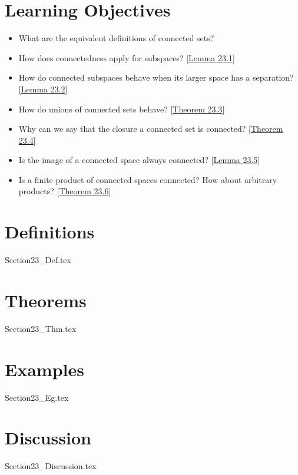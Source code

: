 \section{Learning Objectives}

\begin{itemize}
    \item What are the equivalent definitions of connected sets?
    \item How does connectedness apply for subspaces? 
        [\hyperlink{lem:23.1}{Lemma 23.1}]
    \item How do connected subspaces behave when its larger space has a 
        separation? [\hyperlink{lem:23.2}{Lemma 23.2}]
    \item How do unions of connected sets behave?
        [\hyperlink{thm:23.3}{Theorem 23.3}]
    \item Why can we say that the closure a connected set is connected?
        [\hyperlink{thm:23.4}{Theorem 23.4}]
    \item Is the image of a connected space always connected? 
        [\hyperlink{thm:23.5}{Lemma 23.5}]
    \item Is a finite product of connected spaces connected? How about  
        arbitrary products? [\hyperlink{thm:23.6}{Theorem 23.6}]
\end{itemize}

\section{Definitions}

{Section23_Def.tex}

\section{Theorems}

{Section23_Thm.tex}

\section{Examples}

{Section23_Eg.tex}

\section{Discussion}

{Section23_Discussion.tex}